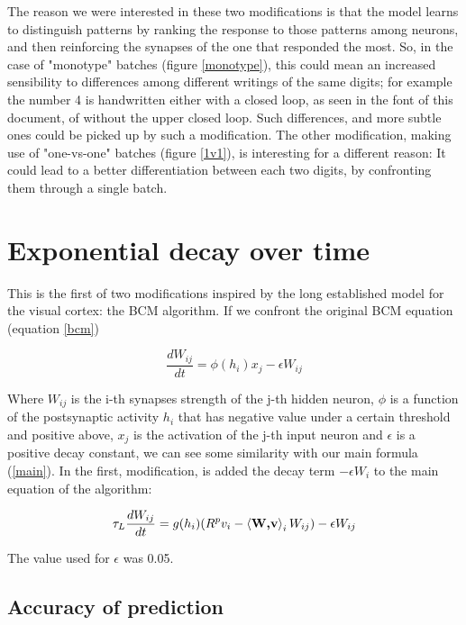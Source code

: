 \documentclass[a4paper]{report}
\begin{document}
The reason we were interested in these two modifications is that the model learns to distinguish patterns by ranking the response to those patterns among neurons, and then reinforcing the synapses of the one that responded the most.
So, in the case of "monotype" batches (figure \ref{monotype}), this could mean an increased sensibility to differences among different writings of the same digits;
for example the number 4 is handwritten either with a closed loop, as seen in the font of this document, of without the upper closed loop.
Such differences, and more subtle ones could be picked up by such a modification.
The other modification, making use of "one-vs-one" batches (figure \ref{1v1}), is interesting for a different reason:
It could lead to a better differentiation between each two digits, by confronting them through a single batch.

\section{Exponential decay over time}

This is the first of two modifications inspired by the long established model for the visual cortex:
the BCM algorithm.
If we confront the original BCM equation (equation \ref{bcm})

\begin{equation}
    \frac{dW_{ij}}{dt} = \phi(h_i)x_{j} - \epsilon W_{ij}
    \label{bcm}
\end{equation}

Where $W_{ij}$ is the i-th synapses strength of the j-th hidden neuron, $\phi$ is a function of the postsynaptic activity $h_i$ that has negative value under a certain threshold and positive above, $x_{j}$ is the activation of the j-th input neuron and $\epsilon$ is a positive decay constant, we can see some similarity with our main formula (\ref{main}).
In the first, modification, is added the decay term $-\epsilon W_i$ to the main equation of the algorithm:

\begin{equation}\label{099}
    \tau_L \frac{dW_{ij}}{dt} = g(h_i)(R^p v_i - \braket{\textbf{W,v}}_i W_{ij} ) -\epsilon W_{ij}
\end{equation}

The value used for $\epsilon$ was 0.05.

\subsection{Accuracy of prediction}
\end{document}
